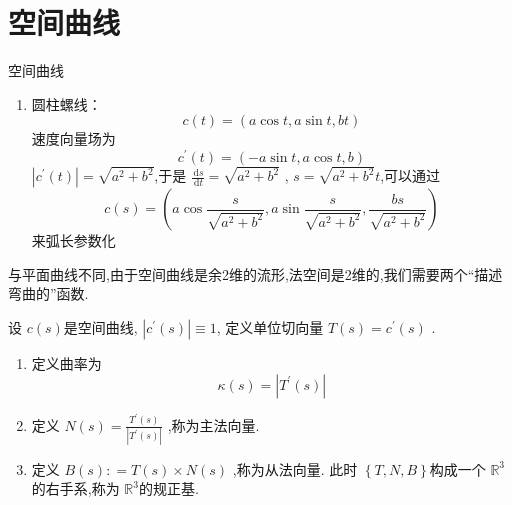 \documentclass[../../古典微分几何.tex]{subfiles}
\begin{document}
\chapter{空间曲线}

\begin{example}{空间曲线}
   \begin{enumerate}
    \item 圆柱螺线： \[
        c\left( t \right)=  \left( a\cos t,a\sin t,bt \right)  
        \] 速度向量场为 \[
        c^{\prime} \left( t \right)= \left( -a\sin t,a\cos t,b \right)  
        \] \(  \left| c^{\prime} \left( t \right)  \right|=  \sqrt{a^{2}+ b^{2}}   \),于是 \(  \frac{\,\mathrm{d} s }{\,\mathrm{d} t } =  \sqrt{a^{2}+ b^{2}}   \)  , \(  s =  \sqrt{a^{2}+ b^{2}}t  \),可以通过 \[
        c\left( s \right)= \left( a\cos \frac{s }{\sqrt{a^{2}+ b^{2}} },a \sin \frac{s }{\sqrt{a^{2}+ b^{2}} }   , \frac{bs }{\sqrt{a^{2}+ b^{2}} } \right)  
        \]来弧长参数化 
   \end{enumerate}
   
\end{example}

\hspace*{\fill} 

\begin{remark}
    与平面曲线不同,由于空间曲线是余2维的流形,法空间是2维的,我们需要两个“描述弯曲的”函数.
\end{remark}

\begin{definition}
    设 \(  c\left( s \right)   \)是空间曲线, \(  \left| c^{\prime} \left( s \right)  \right|\equiv 1   \),
    定义单位切向量 \(  T\left( s \right)=  c^{\prime} \left( s \right)    \)  .
    \begin{enumerate}
        \item 定义曲率为 \[
            \kappa  \left( s \right)=  \left| T^{\prime} \left( s \right)  \right|  
           \]
        \item 定义 \(  N\left( s \right) =  \frac{T^{\prime} \left( s \right)  }{\left| T^{\prime} \left( s \right)  \right|  }    \)  ,称为主法向量.
       
        \item 定义 \(  B\left( s \right): =  T\left( s \right)\times  N\left( s \right)     \) ,称为从法向量.
        此时 \(  \left\{ T,N,B \right\}  \)构成一个 \(  \mathbb{R} ^{3}  \)的右手系,称为 \(  \mathbb{R} ^{3}  \)的规正基.   
    \end{enumerate}
    
\end{definition}
\end{document}
